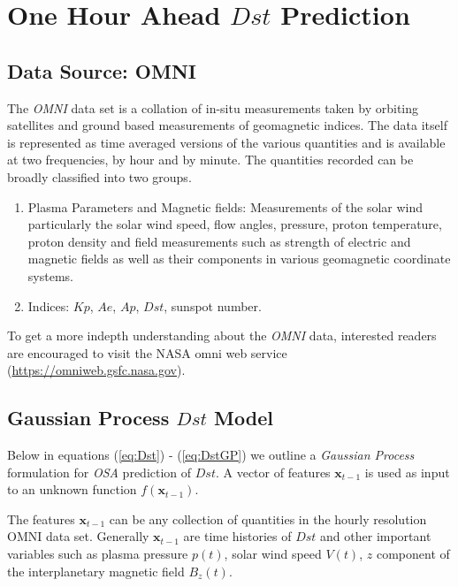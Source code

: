 \documentclass{article}
\begin{document}
\section{One Hour Ahead $Dst$ Prediction} \label{sec:osa}

\subsection{Data Source: OMNI}
The \emph{OMNI} data set is a collation of in-situ measurements taken
by orbiting satellites and ground based measurements of geomagnetic
indices. The data itself is represented as time averaged versions of
the various quantities and is available at two frequencies, by hour
and by minute. The quantities recorded can be broadly classified into
two groups.

\begin{enumerate}

\item Plasma Parameters and Magnetic fields: Measurements of the solar
  wind particularly the solar wind speed, flow angles, pressure,
  proton temperature, proton density and field measurements such as
  strength of electric and magnetic fields as well as their components
  in various geomagnetic coordinate systems.
  
\item Indices: $Kp$, $Ae$, $Ap$, $Dst$, sunspot number.
  
\end{enumerate}

To get a more indepth understanding about the \emph{OMNI} data,
interested readers are encouraged to visit the NASA omni web service (\url{https://omniweb.gsfc.nasa.gov}).

\subsection{Gaussian Process $Dst$ Model}

Below in equations (\ref{eq:Dst}) - (\ref{eq:DstGP}) we outline a
\emph{Gaussian Process} formulation for \emph{OSA} prediction of
$Dst$. A vector of features $\mathbf{x}_{t-1}$ is used as input to an
unknown function $f(\mathbf{x}_{t-1})$.

The features $\mathbf{x}_{t-1}$ can be any collection of quantities in
the hourly resolution OMNI data set. Generally $\mathbf{x}_{t-1}$ are
time histories of $Dst$ and other important variables such as plasma
pressure $p(t)$, solar wind speed $V(t)$, $z$ component of the
interplanetary magnetic field $B_z(t)$.
\end{document}
